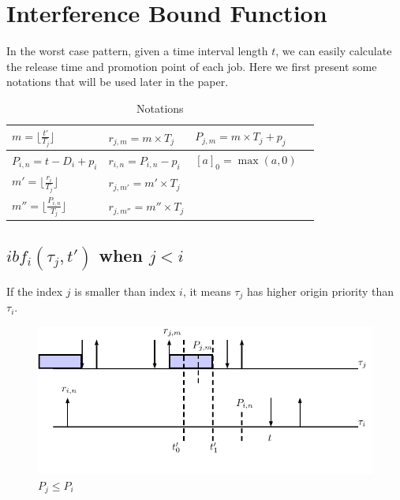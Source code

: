 \documentclass[12pt,conference,twocolumn]{IEEEtran}
\renewcommand{\ae}[1]{{\color{red}{#1}}}
\begin{document}





\section{Interference Bound Function}



In the worst case pattern, given a time interval length $t$, we can easily calculate the release time and promotion point of each job.
Here we first present some notations that  will be used later in the paper.
\begin{table}[h]
\caption{Notations}
\label{tab:x}
\center
\begin{tabular}{|l|l|l|l|}
 \hline
 $m=\lfloor \frac{t'}{T_j}\rfloor$ & $r_{j,m}=m\times T_j$ &$P_{j,m}=m\times T_j+p_j$ \\
 \hline
$P_{i,n}=t-D_i+p_i$ & $r_{i,n}=P_{i,n}-p_i$ &$[a]_0=\max(a,0)$\\
 \hline
$m'=\lfloor \frac{r_i}{T_j}\rfloor$  & $r_{j,m'}=m'\times T_j$& \\
 \hline
	$m''=\lfloor \frac{P_{i,n}}{T_j}\rfloor$ &  $r_{j,m''}=m''\times T_j$&	\\
  \hline
\end{tabular}
\end{table}


\subsection{$ibf_i(\tau_j,t')$ when $j<i$}
If the index $j$ is smaller than index $i$, it means $\tau_j$ has higher origin  priority than $\tau_i$.
\begin{figure}[h!]
 \centering
\includegraphics[scale=0.7]{Figure/C1}  
\caption{$ P_j\leq P_i$}
  \label{fig:case1}
\end{figure}
\end{document}
